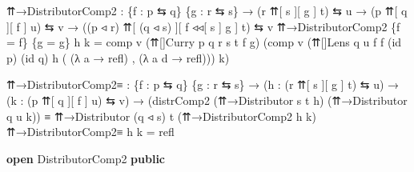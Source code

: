 \documentclass[
  11pt,
  oneside,
  article]{memoir}
\newenvironment{Shaded}{}{}
\newcommand{\KeywordTok}[1]{\textcolor[rgb]{0.00,0.44,0.13}{\textbf{#1}}}
\newcommand{\NormalTok}[1]{#1}
\newcommand{\OtherTok}[1]{\textcolor[rgb]{0.00,0.44,0.13}{#1}}
\theoremstyle{definition}
\theoremstyle{plain}
\newcommand{\0}{\textsf{0}}
\newcommand{\1}{\tn{\textsf{1}}}
\begin{document}
\begin{Shaded}
\begin{Highlighting}[]
\NormalTok{    ⇈→DistributorComp2 }\OtherTok{:} 
        \OtherTok{\{}\NormalTok{f }\OtherTok{:}\NormalTok{ p ⇆ q}\OtherTok{\}} \OtherTok{\{}\NormalTok{g }\OtherTok{:}\NormalTok{ r ⇆ s}\OtherTok{\}}
        \OtherTok{→} \OtherTok{(}\NormalTok{r ⇈[ s ][ g ] t}\OtherTok{)}\NormalTok{ ⇆ u }
        \OtherTok{→} \OtherTok{(}\NormalTok{p ⇈[ q ][ f ] u}\OtherTok{)}\NormalTok{ ⇆ v}
        \OtherTok{→} \OtherTok{((}\NormalTok{p ◃ r}\OtherTok{)}\NormalTok{ ⇈[ }\OtherTok{(}\NormalTok{q ◃ s}\OtherTok{)}\NormalTok{ ][ f ◃◃[ s ] g ] t}\OtherTok{)}\NormalTok{ ⇆ v}
\NormalTok{    ⇈→DistributorComp2 }\OtherTok{\{}\NormalTok{f }\OtherTok{=}\NormalTok{ f}\OtherTok{\}} \OtherTok{\{}\NormalTok{g }\OtherTok{=}\NormalTok{ g}\OtherTok{\}}\NormalTok{ h k }\OtherTok{=}
\NormalTok{        comp v }\OtherTok{(}\NormalTok{⇈[]Curry p q r s t f g}\OtherTok{)} 
             \OtherTok{(}\NormalTok{comp v }\OtherTok{(}\NormalTok{⇈[]Lens q u f f }
                              \OtherTok{(}\NormalTok{id p}\OtherTok{)} \OtherTok{(}\NormalTok{id q}\OtherTok{)}\NormalTok{ h }
                              \OtherTok{(} \OtherTok{(λ}\NormalTok{ a }\OtherTok{→}\NormalTok{ refl}\OtherTok{)} 
\NormalTok{                              , }\OtherTok{(λ}\NormalTok{ a d }\OtherTok{→}\NormalTok{ refl}\OtherTok{)))} 
\NormalTok{                   k}\OtherTok{)}
    
\NormalTok{    ⇈→DistributorComp2≡ }\OtherTok{:} 
        \OtherTok{\{}\NormalTok{f }\OtherTok{:}\NormalTok{ p ⇆ q}\OtherTok{\}} \OtherTok{\{}\NormalTok{g }\OtherTok{:}\NormalTok{ r ⇆ s}\OtherTok{\}}
        \OtherTok{→} \OtherTok{(}\NormalTok{h }\OtherTok{:} \OtherTok{(}\NormalTok{r ⇈[ s ][ g ] t}\OtherTok{)}\NormalTok{ ⇆ u}\OtherTok{)} 
        \OtherTok{→} \OtherTok{(}\NormalTok{k }\OtherTok{:} \OtherTok{(}\NormalTok{p ⇈[ q ][ f ] u}\OtherTok{)}\NormalTok{ ⇆ v}\OtherTok{)}
        \OtherTok{→} \OtherTok{(}\NormalTok{distrComp2 }\OtherTok{(}\NormalTok{⇈→Distributor s t h}\OtherTok{)} 
                      \OtherTok{(}\NormalTok{⇈→Distributor q u k}\OtherTok{))} 
\NormalTok{          ≡ ⇈→Distributor }\OtherTok{(}\NormalTok{q ◃ s}\OtherTok{)}\NormalTok{ t }
                          \OtherTok{(}\NormalTok{⇈→DistributorComp2 h k}\OtherTok{)}
\NormalTok{    ⇈→DistributorComp2≡ h k }\OtherTok{=}\NormalTok{ refl}

\KeywordTok{open}\NormalTok{ DistributorComp2 }\KeywordTok{public}
\end{Highlighting}
\end{Shaded}
\end{document}
